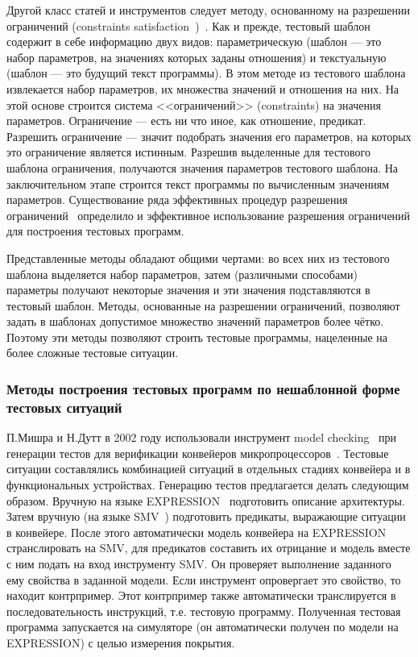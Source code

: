 Другой класс статей и инструментов следует методу, основанному на разрешении ограничений (constraints satisfaction~\cite{CLPusingECLiPSe})~\cite{GenesysPro, GenesysPro2004Innovations, DeepTrans, RAVEN, MAATG}. Как и прежде, тестовый шаблон содержит в себе информацию двух видов: параметрическую (шаблон --- это набор параметров, на значениях которых заданы отношения) и текстуальную (шаблон --- это будущий текст программы). В этом методе из тестового шаблона извлекается набор параметров, их множества значений и отношения на них. На этой основе строится система <<ограничений>> (constraints) на значения параметров. Ограничение --- есть ни что иное, как отношение, предикат. Разрешить ограничение --- значит подобрать значения его параметров, на которых это ограничение является истинным. Разрешив выделенные для тестового шаблона ограничения, получаются значения параметров тестового шаблона. На заключительном этапе строится текст программы по вычисленным значениям параметров. Существование ряда эффективных процедур разрешения ограничений~\cite{CLPusingECLiPSe, SMT} определило и эффективное использование разрешения ограничений для построения тестовых программ.

Представленные методы обладают общими чертами: во всех них из тестового шаблона выделяется набор параметров, затем (различными способами) параметры получают некоторые значения и эти значения подставляются в тестовый шаблон. Методы, основанные на разрешении ограничений, позволяют задать в шаблонах допустимое множество значений параметров более чётко. Поэтому эти методы позволяют строить тестовые программы, нацеленные на более сложные тестовые ситуации.

\subsubsection{Методы построения тестовых программ по нешаблонной форме тестовых ситуаций}%

П.Мишра и Н.Дутт в 2002 году использовали инструмент model checking~\cite{ModelChecking} при генерации тестов для верификации конвейеров микропроцессоров~\cite{MishraDutt02}. Тестовые ситуации составлялись комбинацией ситуаций в отдельных стадиях конвейера и в функциональных устройствах. Генерацию тестов предлагается делать следующим образом. Вручную на языке EXPRESSION~\cite{EXPRESSION} подготовить описание архитектуры. Затем вручную (на языке SMV~\cite{SMV}) подготовить предикаты, выражающие ситуации в конвейере. После этого автоматически модель конвейера на EXPRESSION странслировать на SMV, для предикатов составить их отрицание и модель вместе с ним подать на вход инструменту SMV. Он проверяет выполнение заданного ему свойства в заданной модели. Если инструмент опровергает это свойство, то находит контрпример. Этот контрпример также автоматически транслируется в последовательность инструкций, т.е. тестовую программу. Полученная тестовая программа запускается на симуляторе (он автоматически получен по модели на EXPRESSION) с целью измерения покрытия.


